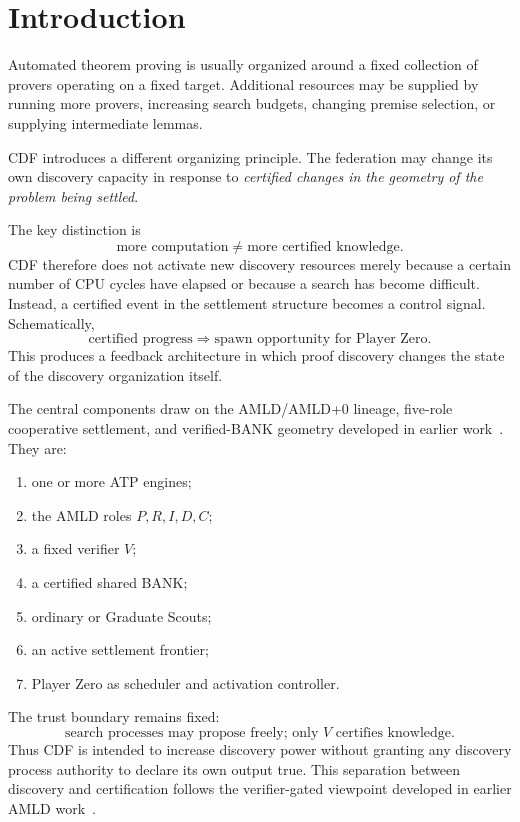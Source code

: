 \documentclass[11pt]{article}
\theoremstyle{definition}
\begin{document}
\clearpage
\setcounter{tocdepth}{2}
\tableofcontents
\clearpage

\section{Introduction}

Automated theorem proving is usually organized around a fixed collection of provers operating on a fixed target. Additional resources may be supplied by running more provers, increasing search budgets, changing premise selection, or supplying intermediate lemmas.

CDF introduces a different organizing principle. The federation may change its own discovery capacity in response to \emph{certified changes in the geometry of the problem being settled}.

The key distinction is
\[
\boxed{\text{more computation}\neq\text{more certified knowledge}.}
\]
CDF therefore does not activate new discovery resources merely because a certain number of CPU cycles have elapsed or because a search has become difficult. Instead, a certified event in the settlement structure becomes a control signal. Schematically,
\[
\text{certified progress}\Longrightarrow\text{spawn opportunity for Player Zero}.
\]
This produces a feedback architecture in which proof discovery changes the state of the discovery organization itself.

The central components draw on the AMLD/AMLD+0 lineage, five-role cooperative settlement, and verified-BANK geometry developed in earlier work~\cite{tenneson-lineage,tenneson-amld2,tenneson-pacman}. They are:
\begin{enumerate}[label=(\arabic*)]
\item one or more ATP engines;
\item the AMLD roles $P,R,I,D,C$;
\item a fixed verifier $V$;
\item a certified shared BANK;
\item ordinary or Graduate Scouts;
\item an active settlement frontier;
\item Player Zero as scheduler and activation controller.
\end{enumerate}

The trust boundary remains fixed:
\[
\boxed{\text{search processes may propose freely; only }V\text{ certifies knowledge}.}
\]
Thus CDF is intended to increase discovery power without granting any discovery process authority to declare its own output true. This separation between discovery and certification follows the verifier-gated viewpoint developed in earlier AMLD work~\cite{tenneson-verifier,tenneson-security}.
\end{document}
